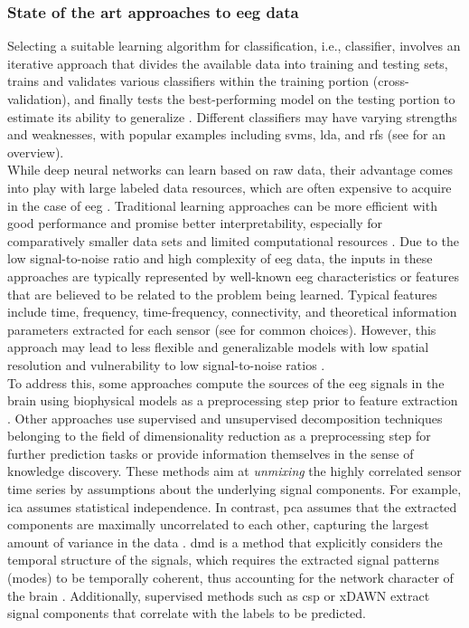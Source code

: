 \subsubsection{State of the art approaches to \gls{eeg} data}
Selecting a suitable learning algorithm for classification, i.e., classifier, involves an iterative approach that divides the available data into training and testing sets, trains and validates various classifiers within the training portion (cross-validation), and finally tests the best-performing model on the testing portion to estimate its ability to generalize \cite{Hastie2009}. Different classifiers may have varying strengths and weaknesses, with popular examples including \glspl{svm}, \gls{lda}, and \glspl{rf} (see \cite{shoorangiz2021eeg} for an overview).\\
While deep neural networks can learn based on raw data, their advantage comes into play with large labeled data resources, which are often expensive to acquire in the case of \gls{eeg} \cite{Banville2021}. Traditional learning approaches can be more efficient with good performance and promise better interpretability, especially for comparatively smaller data sets and limited computational resources \cite{Gemein2020}. Due to the low signal-to-noise ratio and high complexity of \gls{eeg} data, the inputs in these approaches are typically represented by well-known \gls{eeg} characteristics or features that are believed to be related to the problem being learned. Typical features include time, frequency, time-frequency, connectivity, and theoretical information parameters extracted for each sensor (see \cite{Gemein2020} for common choices). However, this approach may lead to less flexible and generalizable models with low spatial resolution and vulnerability to low signal-to-noise ratios \cite{Saeidi2021}.\\
To address this, some approaches compute the sources of the \gls{eeg} signals in the brain using biophysical models as a preprocessing step prior to feature extraction \cite{Khan2018, Westner2018}. Other approaches use supervised and unsupervised decomposition techniques belonging to the field of dimensionality reduction as a preprocessing step for further prediction tasks or provide information themselves in the sense of knowledge discovery. These methods aim at \textit{unmixing} the highly correlated sensor time series by assumptions about the underlying signal components. For example, \gls{ica} assumes statistical independence. In contrast, \gls{pca} assumes that the extracted components are maximally uncorrelated to each other, capturing the largest amount of variance in the data \cite{CohenX2017}. \Gls{dmd} is a method that explicitly considers the temporal structure of the signals, which requires the extracted signal patterns (modes) to be temporally coherent, thus accounting for the network character of the brain \cite{Brunton2016}. Additionally, supervised methods such as \gls{csp} \cite{Blankertz2008} or xDAWN \cite{rivet2009xdawn} extract signal components that correlate with the labels to be predicted.\\
